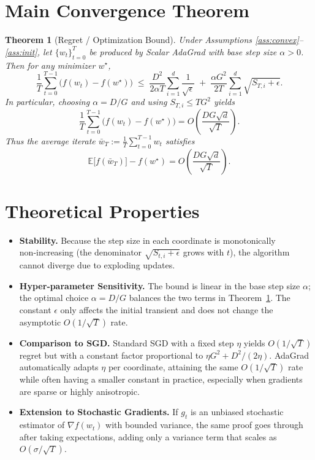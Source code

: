 \documentclass{article}
\newtheorem{theorem}{Theorem}
\newcommand{\E}{\mathbb{E}}
\begin{document}
\section*{Main Convergence Theorem}
\begin{theorem}[Regret / Optimization Bound]\label{thm:main}
Under Assumptions \ref{ass:convex}–\ref{ass:init}, let $\{w_t\}_{t=0}^{T}$ be
produced by Scalar AdaGrad with base step size $\alpha>0$.
Then for any minimizer $w^{\star}$,
\[
    \frac{1}{T}\sum_{t=0}^{T-1}\bigl(f(w_t)-f(w^{\star})\bigr)
    \;\le\;
    \frac{D^2}{2\alpha T}\sum_{i=1}^{d}\frac{1}{\sqrt{\epsilon}}
    \;+\;
    \frac{\alpha G^2}{2T}\sum_{i=1}^{d}\sqrt{S_{T,i}+\epsilon}.
\]
In particular, choosing $\alpha = D/ G$ and using $S_{T,i}\le TG^2$ yields
\[
    \frac{1}{T}\sum_{t=0}^{T-1}\bigl(f(w_t)-f(w^{\star})\bigr)
    = O\!\left(\frac{DG\sqrt{d}}{\sqrt{T}}\right).
\]
Thus the average iterate $\bar w_T:=\frac1T\sum_{t=0}^{T-1}w_t$ satisfies
\[
    \E\bigl[f(\bar w_T)\bigr]-f(w^{\star}) = O\!\left(\frac{DG\sqrt{d}}{\sqrt{T}}\right).
\]
\end{theorem}

\section*{Theoretical Properties}
\begin{itemize}[leftmargin=*]
\item \textbf{Stability.} Because the step size in each coordinate is
monotonically non‑increasing (the denominator $\sqrt{S_{t,i}+\epsilon}$
grows with $t$), the algorithm cannot diverge due to exploding
updates.

\item \textbf{Hyper‑parameter Sensitivity.}
The bound is linear in the base step size $\alpha$; the optimal choice
$\alpha = D/G$ balances the two terms in Theorem~\ref{thm:main}.
The constant $\epsilon$ only affects the initial transient and does not
change the asymptotic $O(1/\sqrt{T})$ rate.

\item \textbf{Comparison to SGD.}
Standard SGD with a fixed step $\eta$ yields $O(1/\sqrt{T})$ regret but
with a constant factor proportional to $\eta G^2 + D^2/(2\eta)$.
AdaGrad automatically adapts $\eta$ per coordinate, attaining the
same $O(1/\sqrt{T})$ rate while often having a smaller constant in
practice, especially when gradients are sparse or highly anisotropic.

\item \textbf{Extension to Stochastic Gradients.}
If $g_t$ is an unbiased stochastic estimator of $\nabla f(w_t)$ with
bounded variance, the same proof goes through after taking expectations,
adding only a variance term that scales as $O(\sigma/\sqrt{T})$.
\end{itemize}
\end{document}
